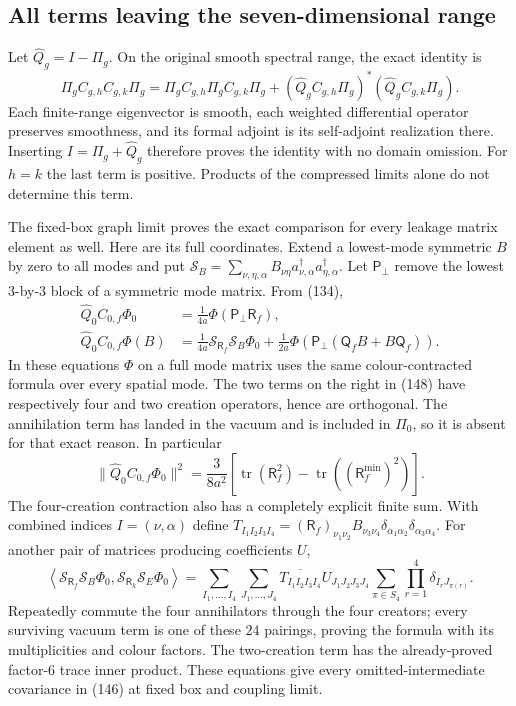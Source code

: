 \documentclass[11pt]{article}
\begin{document}
\subsection{All terms leaving the seven-dimensional range}

Let $\widehat Q_g=I-\Pi_g$. On the original smooth spectral range,
the exact identity is
\begin{equation}\label{eq:local-leakage}
 \Pi_g C_{g,h}C_{g,k}\Pi_g
 =\Pi_gC_{g,h}\Pi_gC_{g,k}\Pi_g+
       (\widehat Q_gC_{g,h}\Pi_g)^*
                        (\widehat Q_gC_{g,k}\Pi_g).
\end{equation}
Each finite-range eigenvector is smooth, each weighted differential
operator preserves smoothness, and its formal adjoint is its
self-adjoint realization there. Inserting $I=\Pi_g+\widehat Q_g$
therefore proves the identity with no domain omission.
For $h=k$ the last term is positive. Products of the compressed
limits alone do not determine this term.

The fixed-box graph limit proves the exact comparison for every
leakage matrix element as well. Here are its full coordinates.
Extend a lowest-mode symmetric $B$ by zero to all modes and put
$\mathcal S_B= \sum_{\nu,\eta,\alpha}
B_{\nu\eta}a_{\nu,\alpha}^\dagger a_{\eta,\alpha}^\dagger$.
Let $\mathsf P_\perp$ remove the lowest $3$-by-$3$ block of a
symmetric mode matrix. From (134),
\begin{align}
 \widehat Q_0C_{0,f}\Phi_0
 &=\frac1{4a}\Phi(\mathsf P_\perp\mathsf R_f),
 \label{eq:local-leak-vac}\\
 \widehat Q_0C_{0,f}\Phi(B)
 &=\frac1{4a}\mathcal S_{\mathsf R_f}\mathcal S_B\Phi_0
 +\frac1{2a}
 \Phi\!\left(\mathsf P_\perp(\mathsf Q_fB+B\mathsf Q_f)\right).
 \label{eq:local-leak-pair}
\end{align}
In these equations $\Phi$ on a full mode matrix uses the same
colour-contracted formula over every spatial mode.
The two terms on the right in (148) have
respectively four and two creation operators, hence are orthogonal.
The annihilation term has landed in the vacuum and is included in
$\Pi_0$, so it is absent for that exact reason.
In particular
\[
 \|\widehat Q_0C_{0,f}\Phi_0\|^2
 =\frac3{8a^2}\left[
 \operatorname{tr}(\mathsf R_f^2)
           -\operatorname{tr}((\mathsf R_f^{\min})^2)\right].
\]
The four-creation contraction also has a completely explicit finite
sum. With combined indices $I=(\nu,\alpha)$ define
$T_{I_1I_2I_3I_4}
=(\mathsf R_f)_{\nu_1\nu_2}B_{\nu_3\nu_4}
\delta_{\alpha_1\alpha_2}\delta_{\alpha_3\alpha_4}$.
For another pair of matrices producing coefficients $U$,
\[
 \left\langle\mathcal S_{\mathsf R_f}\mathcal S_B\Phi_0,
              \mathcal S_{\mathsf R_k}\mathcal S_E\Phi_0\right\rangle
 =\sum_{I_1,\ldots,I_4}\sum_{J_1,\ldots,J_4}
 \overline{T_{I_1I_2I_3I_4}}U_{J_1J_2J_3J_4}
 \sum_{\pi\in S_4}\prod_{r=1}^4\delta_{I_rJ_{\pi(r)}}.
\]
Repeatedly commute the four annihilators through the four creators;
every surviving vacuum term is one of these $24$ pairings, proving
the formula with its multiplicities and colour factors.
The two-creation term has the already-proved factor-$6$ trace
inner product. These equations give every omitted-intermediate
covariance in (146) at fixed box and coupling limit.
\end{document}
